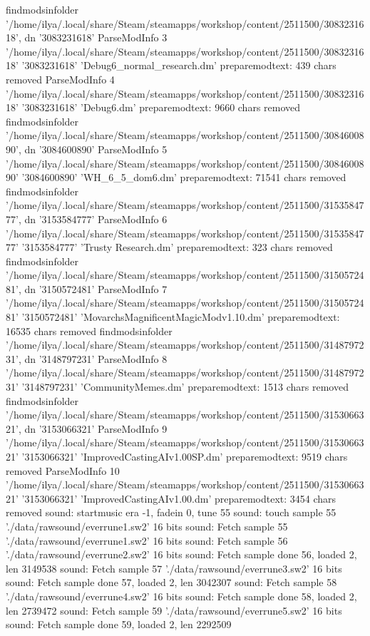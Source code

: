 findmodsinfolder '/home/ilya/.local/share/Steam/steamapps/workshop/content/2511500/3083231618', dn '3083231618'
ParseModInfo 3 '/home/ilya/.local/share/Steam/steamapps/workshop/content/2511500/3083231618' '3083231618' 'Debug6_normal_research.dm'
preparemodtext: 439 chars removed
ParseModInfo 4 '/home/ilya/.local/share/Steam/steamapps/workshop/content/2511500/3083231618' '3083231618' 'Debug6.dm'
preparemodtext: 9660 chars removed
findmodsinfolder '/home/ilya/.local/share/Steam/steamapps/workshop/content/2511500/3084600890', dn '3084600890'
ParseModInfo 5 '/home/ilya/.local/share/Steam/steamapps/workshop/content/2511500/3084600890' '3084600890' 'WH_6_5_dom6.dm'
preparemodtext: 71541 chars removed
findmodsinfolder '/home/ilya/.local/share/Steam/steamapps/workshop/content/2511500/3153584777', dn '3153584777'
ParseModInfo 6 '/home/ilya/.local/share/Steam/steamapps/workshop/content/2511500/3153584777' '3153584777' 'Trusty Research.dm'
preparemodtext: 323 chars removed
findmodsinfolder '/home/ilya/.local/share/Steam/steamapps/workshop/content/2511500/3150572481', dn '3150572481'
ParseModInfo 7 '/home/ilya/.local/share/Steam/steamapps/workshop/content/2511500/3150572481' '3150572481' 'MovarchsMagnificentMagicModv1.10.dm'
preparemodtext: 16535 chars removed
findmodsinfolder '/home/ilya/.local/share/Steam/steamapps/workshop/content/2511500/3148797231', dn '3148797231'
ParseModInfo 8 '/home/ilya/.local/share/Steam/steamapps/workshop/content/2511500/3148797231' '3148797231' 'CommunityMemes.dm'
preparemodtext: 1513 chars removed
findmodsinfolder '/home/ilya/.local/share/Steam/steamapps/workshop/content/2511500/3153066321', dn '3153066321'
ParseModInfo 9 '/home/ilya/.local/share/Steam/steamapps/workshop/content/2511500/3153066321' '3153066321' 'ImprovedCastingAIv1.00SP.dm'
preparemodtext: 9519 chars removed
ParseModInfo 10 '/home/ilya/.local/share/Steam/steamapps/workshop/content/2511500/3153066321' '3153066321' 'ImprovedCastingAIv1.00.dm'
preparemodtext: 3454 chars removed
sound: startmusic era -1, fadein 0, tune 55
sound: touch sample 55 './data/rawsound/everrune1.sw2' 16 bits
sound: Fetch sample 55 './data/rawsound/everrune1.sw2' 16 bits
sound: Fetch sample 56 './data/rawsound/everrune2.sw2' 16 bits
sound:  Fetch sample done 56, loaded 2, len 3149538
sound: Fetch sample 57 './data/rawsound/everrune3.sw2' 16 bits
sound:  Fetch sample done 57, loaded 2, len 3042307
sound: Fetch sample 58 './data/rawsound/everrune4.sw2' 16 bits
sound:  Fetch sample done 58, loaded 2, len 2739472
sound: Fetch sample 59 './data/rawsound/everrune5.sw2' 16 bits
sound:  Fetch sample done 59, loaded 2, len 2292509
